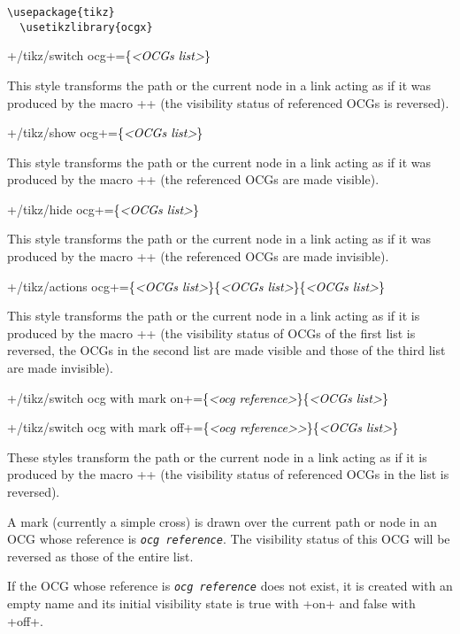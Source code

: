 \documentclass[a4paper]{ltxdoc}
\newcommand\argument[1]{\textcolor{black}{\ttfamily #1}}
\begin{document}
\begin{lstlisting}[style=TeXcode]
  \usepackage{tikz}
  \usetikzlibrary{ocgx}
\end{lstlisting}

\begin{list}{}
\item
\noindent\style+/tikz/switch ocg+\argument{=\{\emph{<OCGs list>}\}}

This style transforms the path or the current node in a link acting as
if it was produced by the macro \code+\switchocg+ (the visibility status
of referenced OCGs is reversed).

\noindent\style+/tikz/show ocg+\argument{=\{\emph{<OCGs list>}\}}

This style transforms the path or the current node in a link acting as
if it was produced by the macro \code+\showocg+ (the referenced OCGs are
made visible).

\noindent\style+/tikz/hide ocg+\argument{=\{\emph{<OCGs list>}\}}

This style transforms the path or the current node in a link acting as
if it was produced by the macro \code+\hideocg+ (the referenced OCGs are
made invisible).

\noindent\style+/tikz/actions ocg+\argument{=\{\emph{<OCGs
    list>}\}\{\emph{<OCGs list>}\}\{\emph{<OCGs list>}\}}

This style transforms the path or the current node in a link acting as
if it is produced by the macro \code+\actionsocg+ (the visibility status
of OCGs of the first list is reversed, the OCGs in the second list are
made visible and those of the third list are made invisible).

\noindent\style+/tikz/switch ocg with mark on+\argument{=\{\emph{<ocg reference>}\}\{\emph{<OCGs list>}\}}

\noindent\style+/tikz/switch ocg with mark off+\argument{=\{\emph{<ocg reference>>}\}\{\emph{<OCGs list>}\}}

These styles transform the path or the current node in a link acting as
if it is produced by the macro \code+\switchocg+ (the visibility status
of referenced OCGs in the list is reversed).

A mark (currently a simple cross) is drawn over the current path or node
in an OCG whose reference is \texttt{\emph{ocg reference}}. The
visibility status of this OCG will be reversed as those of the entire
list.

If the OCG whose reference is \texttt{\emph{ocg reference}} does not
exist, it is created with an empty name and its initial visibility state
is true with \code+on+ and false with \code+off+.
\end{list}
\end{document}
